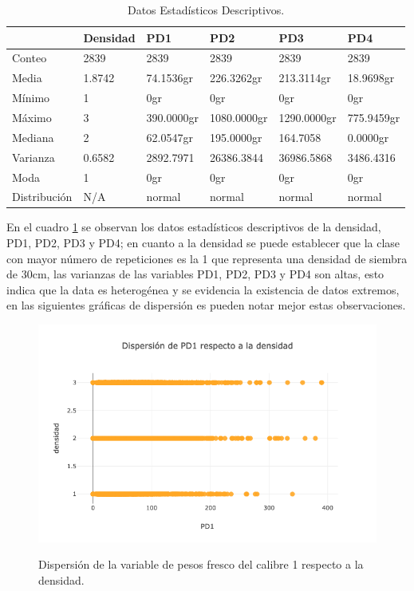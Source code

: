 \begin{table}[htbp]
\begin{center}
\begin{tabular}{|l|l|l|l|l|l|}
\hline
& Densidad & PD1 & PD2 & PD3 & PD4  \\
\hline \hline
Conteo & 2839 & 2839 & 2839 & 2839 & 2839  \\ \hline
Media & 1.8742 & 74.1536gr & 226.3262gr & 213.3114gr & 18.9698gr  \\ \hline
Mínimo & 1 & 0gr & 0gr & 0gr & 0gr  \\ \hline
Máximo & 3 & 390.0000gr & 1080.0000gr & 1290.0000gr & 775.9459gr  \\ \hline
Mediana & 2 & 62.0547gr &195.0000gr & 164.7058 & 0.0000gr \\ \hline
Varianza & 0.6582 & 2892.7971 & 26386.3844 & 36986.5868 & 3486.4316 \\ \hline
Moda & 1 & 0gr & 0gr & 0gr & 0gr  \\ \hline
Distribución & N/A & normal & normal & normal & normal  \\ \hline
\end{tabular}
\caption{Datos Estadísticos Descriptivos.}
\label{tabla:descriptivos}
\end{center}
\end{table}
En el cuadro \ref{tabla:descriptivos} se observan los datos estadísticos descriptivos de la densidad, PD1, PD2, PD3 y PD4; en cuanto a la densidad se puede establecer que la clase con mayor número de repeticiones es la 1 que representa una densidad de siembra de 30cm, las varianzas de las variables PD1, PD2, PD3 y PD4 son altas, esto indica que la data es heterogénea y se evidencia la existencia de datos extremos, en las siguientes gráficas de dispersión es pueden notar mejor estas observaciones.\\

\begin{figure}[h!]
	\caption{Dispersión de la variable de pesos fresco del calibre 1 respecto a la densidad.}
	\centering
	\includegraphics[scale=0.5]{d-pd1.png}
	\label{fig:dpd1}
\end{figure}

